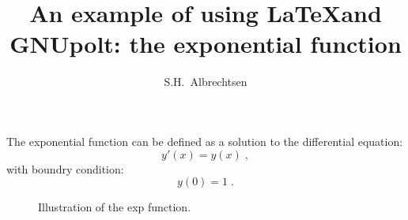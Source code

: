 \documentclass[twocolumn]{article}
\title{An example of using \LaTeX and GNUpolt: the exponential function}
\author{S.H.~Albrechtsen}
\begin{document}
\maketitle
The exponential function can be defined as a solution to the differential equation:
\begin{equation}\label{diff-eq}
y'(x) = y(x) \;,
\end{equation}
with boundry condition:
\begin{equation}\label{bound-cond}
y(0) = 1 \;.
\end{equation}

\begin{figure}[h]

\caption{Illustration of the exp function.}
\end{figure}
\end{document}
